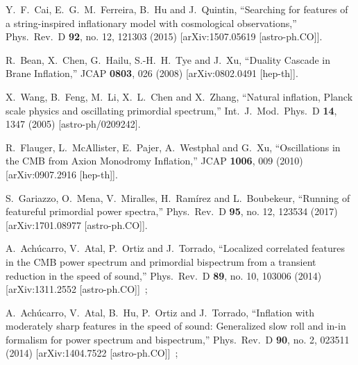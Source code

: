 \documentclass[12pt]{article}
\begin{document}
\begin{thebibliography}{99}
  Y.~F.~Cai, E.~G.~M.~Ferreira, B.~Hu and J.~Quintin,
  ``Searching for features of a string-inspired inflationary model with cosmological observations,''
  Phys.\ Rev.\ D {\bf 92}, no. 12, 121303 (2015)
  [arXiv:1507.05619 [astro-ph.CO]].
  
  R.~Bean, X.~Chen, G.~Hailu, S.-H.~H.~Tye and J.~Xu,
  ``Duality Cascade in Brane Inflation,''
  JCAP {\bf 0803}, 026 (2008)
  [arXiv:0802.0491 [hep-th]].
  
  
  
  X.~Wang, B.~Feng, M.~Li, X.~L.~Chen and X.~Zhang,
  ``Natural inflation, Planck scale physics and oscillating primordial spectrum,''
  Int.\ J.\ Mod.\ Phys.\ D {\bf 14}, 1347 (2005)
  [astro-ph/0209242].

  
  R.~Flauger, L.~McAllister, E.~Pajer, A.~Westphal and G.~Xu,
  ``Oscillations in the CMB from Axion Monodromy Inflation,''
  JCAP {\bf 1006}, 009 (2010)
  [arXiv:0907.2916 [hep-th]].
 
  
  S.~Gariazzo, O.~Mena, V.~Miralles, H.~Ramírez and L.~Boubekeur,
  ``Running of featureful primordial power spectra,''
  Phys.\ Rev.\ D {\bf 95}, no. 12, 123534 (2017)
  [arXiv:1701.08977 [astro-ph.CO]].


  
   A.~Ach\'ucarro, V.~Atal, P.~Ortiz and J.~Torrado,
  ``Localized correlated features in the CMB power spectrum and primordial bispectrum from a transient reduction in the speed of sound,''
  Phys.\ Rev.\ D {\bf 89}, no. 10, 103006 (2014)
  [arXiv:1311.2552 [astro-ph.CO]]~;

  A.~Ach\'ucarro, V.~Atal, B.~Hu, P.~Ortiz and J.~Torrado,
  ``Inflation with moderately sharp features in the speed of sound: Generalized slow roll and in-in formalism for power spectrum and bispectrum,''
  Phys.\ Rev.\ D {\bf 90}, no. 2, 023511 (2014)
  [arXiv:1404.7522 [astro-ph.CO]]~;
 

\end{thebibliography}
\end{document}
